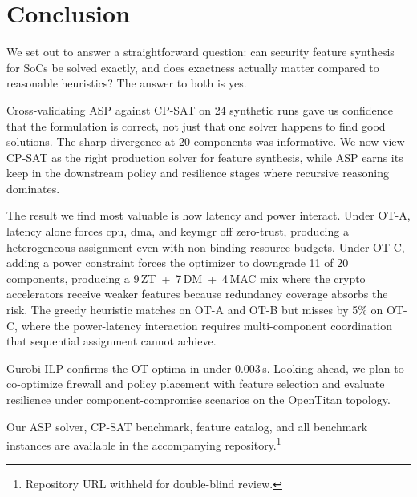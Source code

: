 \documentclass[conference]{IEEEtran}
\begin{document}
\section{Conclusion}

We set out to answer a straightforward question: can security
feature synthesis for SoCs be solved exactly, and does exactness
actually matter compared to reasonable heuristics? The answer to both
is yes.

Cross-validating ASP against CP-SAT on 24 synthetic runs gave us
confidence that the formulation is correct, not just that one solver
happens to find good solutions.  The sharp divergence at 20 components was
informative. We now view CP-SAT as the right production solver for
feature synthesis, while ASP earns its keep in the downstream
policy and resilience stages where recursive reasoning dominates.

The result we find most valuable is how latency and power interact.
Under OT-A, latency alone forces cpu, dma, and keymgr off
zero-trust, producing a heterogeneous assignment even with non-binding resource budgets.  Under OT-C, adding a power constraint forces the
optimizer to downgrade 11 of 20 components, producing a
9\,ZT~+~7\,DM~+~4\,MAC mix where the crypto accelerators receive
weaker features because redundancy coverage absorbs the risk.
The greedy heuristic matches on OT-A and OT-B but misses by 5\%
on OT-C, where the power-latency interaction requires multi-component
coordination that sequential assignment cannot achieve.

Gurobi ILP confirms the OT optima in under 0.003\,s.
Looking ahead, we plan to co-optimize firewall and policy placement
with feature selection and evaluate resilience under component-compromise
scenarios on the OpenTitan topology.

Our ASP solver, CP-SAT benchmark, feature catalog, and all
benchmark instances are available in the accompanying
repository.\footnote{Repository URL withheld for double-blind review.}



\end{document}

